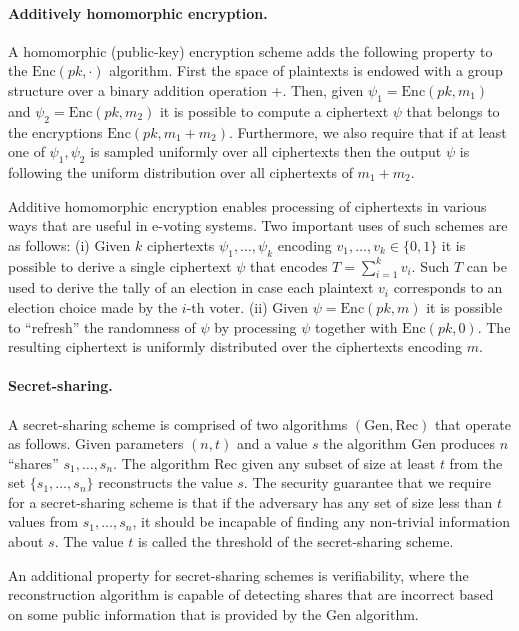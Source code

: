 \paragraph{Additively homomorphic encryption.} A homomorphic
(public-key) encryption scheme adds the following property to the
$\mathrm{Enc}(pk, \cdot)$ algorithm.  First the space of plaintexts is
endowed with a group structure over a binary addition operation
$+$. Then, given $\psi_1 = \mathrm{Enc}(pk, m_1)$ and
$\psi_2 = \mathrm{Enc}(pk, m_2)$ it is possible to compute a
ciphertext $\psi$ that belongs to the encryptions
$\mathrm{Enc}(pk, m_1 + m_2)$. Furthermore, we also require that if
at least one of $\psi_1, \psi_2$ is sampled uniformly over all
ciphertexts then the output $\psi$ is following the uniform
distribution over all ciphertexts of $m_1 + m_2$.

Additive homomorphic encryption enables processing of ciphertexts in
various ways that are useful in e-voting systems.  Two important uses
of such schemes are as follows: (i) Given $k$ ciphertexts
$\psi_1, \ldots, \psi_k$ encoding $v_1, \ldots, v_k \in \{0,1\}$ it is
possible to derive a single ciphertext $\psi$ that encodes
$T= \sum^k_{i=1} v_i$. Such $T$ can be used to derive the tally of an
election in case each plaintext $v_i$ corresponds to an election
choice made by the $i$-th voter.  (ii) Given
$\psi = \mathrm{Enc}(pk, m)$ it is possible to ``refresh'' the
randomness of $\psi$ by processing $\psi$ together with
$\mathrm{Enc}(pk, 0)$. The resulting ciphertext is uniformly
distributed over the ciphertexts encoding $m$.

\paragraph{Secret-sharing.} A secret-sharing scheme is comprised of
two algorithms $(\mathrm{Gen}, \mathrm{Rec})$ that operate as
follows. Given parameters $(n,t)$ and a value $s$ the algorithm
$\mathrm{Gen}$ produces $n$ ``shares'' $s_1, \ldots, s_n$. The
algorithm $\mathrm{Rec}$ given any subset of size at least $t$ from
the set $\{s_1, \ldots, s_n\}$ reconstructs the value $s$.  The
security guarantee that we require for a secret-sharing scheme is that
if the adversary has any set of size less than $t$ values from
$s_1,\ldots, s_n$, it should be incapable of finding any non-trivial
information about $s$.  The value $t$ is called the threshold of the
secret-sharing scheme.

An additional property for secret-sharing schemes is verifiability,
where the reconstruction algorithm is capable of detecting shares that
are incorrect based on some public information that is provided by the
$\mathrm{Gen}$ algorithm.

